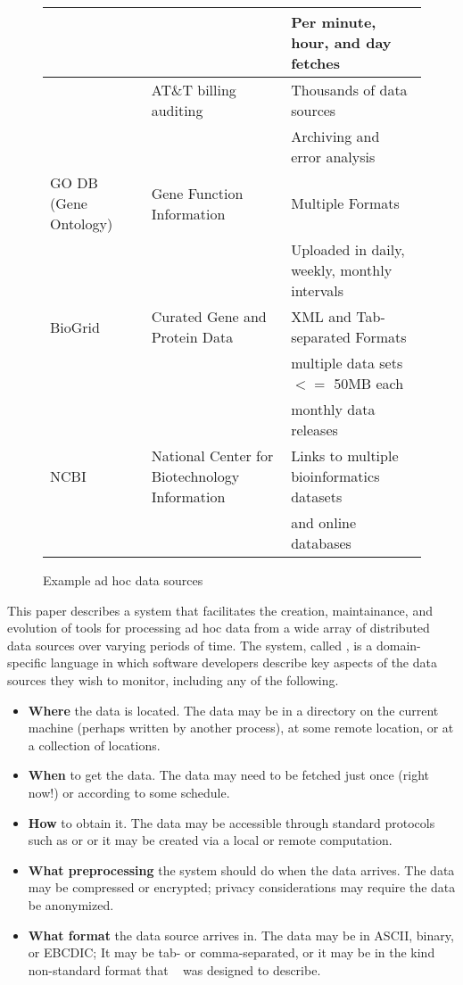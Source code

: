\begin{figure*}
\begin{center}
\begin{tabular}{|l|l|l|}
                                           && Per minute, hour, and day fetches\\\hline
\ningaui{}       & AT\&T billing auditing   & Thousands of data sources\\
                 &                          & Archiving and error analysis\\\hline
GO DB (Gene Ontology)~\cite{geneontology} & Gene Function Information & Multiple Formats \\
                                             && Uploaded in daily, weekly, monthly intervals \\\hline
BioGrid~\cite{biogrid} & Curated Gene and Protein Data & XML and Tab-separated Formats \\
          & & multiple data sets $<=$ 50MB each \\
          & & monthly data releases \\\hline
NCBI~\cite{ncbi} & National Center for Biotechnology Information & Links to multiple bioinformatics datasets \\
                                                     && and online databases\\
\hline\hline
\end{tabular}
\end{center}
\caption{Example ad hoc data sources}
\label{fig:exampledata}
\end{figure*}

This paper describes a system that facilitates the creation,
maintainance, and evolution of tools for processing ad hoc data from a
wide array of distributed data sources over varying periods of
time. The system, called \padsd{}, is a domain-specific language in
which software developers describe key aspects of the data sources
they wish to monitor, including any of the following.

\begin{itemize}
\item {\bf Where} the data is located.  The data may be in a directory
on the current machine (perhaps written by another process), at some 
remote location, or at a collection of locations.
\item {\bf When} to get the data.  The data may need to be fetched just 
once (right now!) or according to some schedule.
\item {\bf How} to obtain it.  The data may be accessible through standard 
protocols such as  or  or it may be created via a
local or remote computation. 
\item {\bf What preprocessing} the system should do when the data arrives.  The 
data may be compressed or encrypted;  privacy considerations may require 
the data be anonymized.
\item {\bf What format} the data source arrives in.  The data may be
  in ASCII, binary, or EBCDIC; It may be tab- or comma-separated, or
  it may be in the kind non-standard format that
  \pads{}~\cite{fisher+:pads,mandelbaum+:pads-ml} was designed to describe.
\end{itemize}

